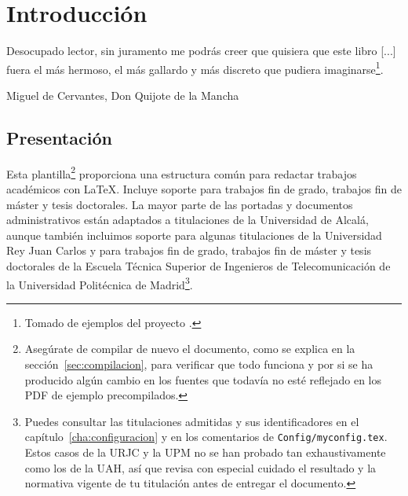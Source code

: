 %

\chapter{Introducción}
\label{cha:introduccion}

\begin{FraseCelebre}
  \begin{Frase}
    Desocupado lector, sin juramento me podrás creer que quisiera que este libro [...] fuera el más hermoso, el más gallardo y más discreto que pudiera imaginarse\footnote{Tomado de ejemplos del proyecto \texis{}.}.
  \end{Frase}
  \begin{Fuente}
    Miguel de Cervantes, Don Quijote de la Mancha
  \end{Fuente}
\end{FraseCelebre}


\section{Presentación}
\label{sec:presentacion}

Esta plantilla\footnote{Asegúrate de compilar de nuevo el documento, como se explica en la sección~\ref{sec:compilacion}, para verificar que todo funciona y por si se ha producido algún cambio en los fuentes que todavía no esté reflejado en los PDF de ejemplo precompilados.} proporciona una estructura común para redactar trabajos académicos con \LaTeX{}. Incluye soporte para trabajos fin de grado, trabajos fin de máster y tesis doctorales. La mayor parte de las portadas y documentos administrativos están adaptados a titulaciones de la Universidad de Alcalá, aunque también incluimos soporte para algunas titulaciones de la Universidad Rey Juan Carlos y para trabajos fin de grado, trabajos fin de máster y tesis doctorales de la Escuela Técnica Superior de Ingenieros de Telecomunicación de la Universidad Politécnica de Madrid\footnote{Puedes consultar las titulaciones admitidas y sus identificadores en el capítulo~\ref{cha:configuracion} y en los comentarios de \texttt{Config/myconfig.tex}. Estos casos de la URJC y la UPM no se han probado tan exhaustivamente como los de la UAH, así que revisa con especial cuidado el resultado y la normativa vigente de tu titulación antes de entregar el documento.}.

